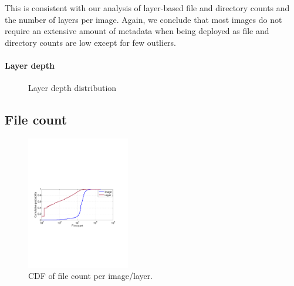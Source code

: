 This is consistent with our analysis of layer-based file and directory counts
and the number of layers per image. Again, we conclude that most images do not
require an extensive amount of metadata when being deployed as file and
directory counts are low except for few outliers.

%


\paragraph{Layer depth}

\begin{figure}[!t]
	\centering
	\caption{Layer depth distribution}
	\label{fig:reference-cnt}
\end{figure}

\subsection{File count} 
\begin{figure}
	\centering
	\includegraphics[width=0.4\textwidth]{graphs/file-cnt-cdf.pdf}
	\caption{CDF of file count per image/layer.
	}
	\label{fig:reference-cnt}
\end{figure}

